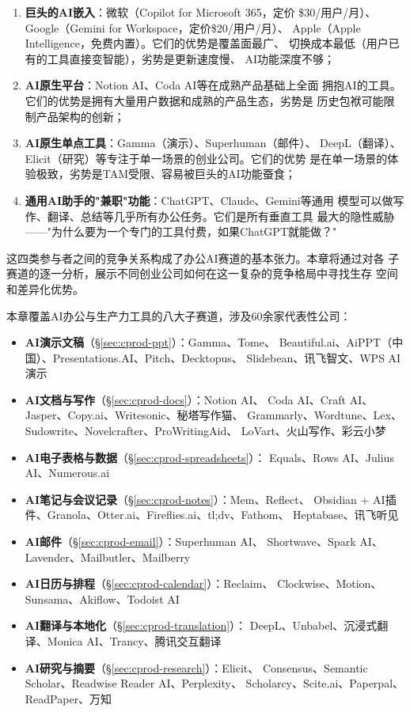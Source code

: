 \begin{enumerate}
  \item \textbf{巨头的AI嵌入}：微软（Copilot for Microsoft 365，定价
    \$30/用户/月）、Google（Gemini for Workspace，定价\$20/用户/月）、
    Apple（Apple Intelligence，免费内置）。它们的优势是覆盖面最广、
    切换成本最低（用户已有的工具直接变智能），劣势是更新速度慢、
    AI功能深度不够；
  \item \textbf{AI原生平台}：Notion AI、Coda AI等在成熟产品基础上全面
    拥抱AI的工具。它们的优势是拥有大量用户数据和成熟的产品生态，劣势是
    历史包袱可能限制产品架构的创新；
  \item \textbf{AI原生单点工具}：Gamma（演示）、Superhuman（邮件）、
    DeepL（翻译）、Elicit（研究）等专注于单一场景的创业公司。它们的优势
    是在单一场景的体验极致，劣势是TAM受限、容易被巨头的AI功能蚕食；
  \item \textbf{通用AI助手的"兼职"功能}：ChatGPT、Claude、Gemini等通用
    模型可以做写作、翻译、总结等几乎所有办公任务。它们是所有垂直工具
    最大的隐性威胁——"为什么要为一个专门的工具付费，如果ChatGPT就能做？"
\end{enumerate}

这四类参与者之间的竞争关系构成了办公AI赛道的基本张力。本章将通过对各
子赛道的逐一分析，展示不同创业公司如何在这一复杂的竞争格局中寻找生存
空间和差异化优势。

\begin{corebox}[本章概览]
本章覆盖AI办公与生产力工具的八大子赛道，涉及60余家代表性公司：
\begin{itemize}
  \item \textbf{AI演示文稿}（\S\ref{sec:cprod-ppt}）：Gamma、Tome、
    Beautiful.ai、AiPPT（中国）、Presentations.AI、Pitch、Decktopus、
    Slidebean、讯飞智文、WPS AI演示
  \item \textbf{AI文档与写作}（\S\ref{sec:cprod-docs}）：Notion AI、
    Coda AI、Craft AI、Jasper、Copy.ai、Writesonic、秘塔写作猫、
    Grammarly、Wordtune、Lex、Sudowrite、Novelcrafter、ProWritingAid、
    LoVart、火山写作、彩云小梦
  \item \textbf{AI电子表格与数据}（\S\ref{sec:cprod-spreadsheets}）：
    Equals、Rows AI、Julius AI、Numerous.ai
  \item \textbf{AI笔记与会议记录}（\S\ref{sec:cprod-notes}）：Mem、Reflect、
    Obsidian + AI插件、Granola、Otter.ai、Fireflies.ai、tl;dv、Fathom、
    Heptabase、讯飞听见
  \item \textbf{AI邮件}（\S\ref{sec:cprod-email}）：Superhuman AI、
    Shortwave、Spark AI、Lavender、Mailbutler、Mailberry
  \item \textbf{AI日历与排程}（\S\ref{sec:cprod-calendar}）：Reclaim、
    Clockwise、Motion、Sunsama、Akiflow、Todoist AI
  \item \textbf{AI翻译与本地化}（\S\ref{sec:cprod-translation}）：
    DeepL、Unbabel、沉浸式翻译、Monica AI、Trancy、腾讯交互翻译
  \item \textbf{AI研究与摘要}（\S\ref{sec:cprod-research}）：Elicit、
    Consensus、Semantic Scholar、Readwise Reader AI、Perplexity、
    Scholarcy、Scite.ai、Paperpal、ReadPaper、万知
\end{itemize}
\end{corebox}

